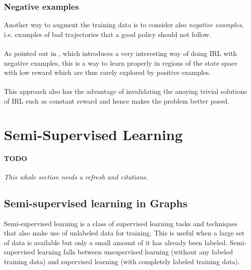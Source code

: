 \documentclass{article}
\begin{document}
\subsubsection{Negative examples}
Another way to augment the training data is to consider also \emph{negative examples}, i.e. examples of bad trajectories that a good policy should not follow.

\paragraph{}
As pointed out in \cite{Lee16}, which introduces a very interesting way of doing IRL with negative examples, this is a way to learn properly in regions of the state space with low reward which are thus rarely explored by positive examples.

\paragraph{}
This approach also has the advantage of invalidating the anoying trivial solutions of IRL such as constant reward and hence makes the problem better posed.


\section{Semi-Supervised Learning \label{sec:ssl}}

\paragraph{TODO} \emph{This whole section needs a refresh and citations.}

\subsection{Semi-supervised learning in Graphs}

Semi-supervised learning is a class of supervised learning tasks and techniques that also make use of unlabeled data for training. This is useful when a large set of data is available but only a small amount of it has already been labeled. Semi-supervised learning falls between unsupervised learning (without any labeled training data) and supervised learning (with completely labeled training data).
\end{document}
